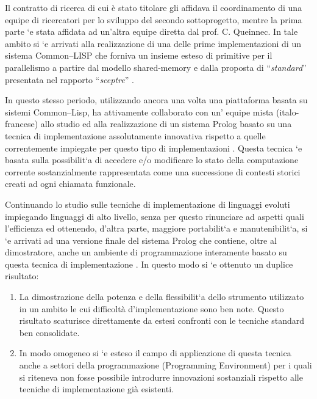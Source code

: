 \documentclass[11pt]{article}
\begin{document}
Il contratto di ricerca di cui \`e stato titolare gli affidava il
coordinamento di una equipe di ricercatori per lo sviluppo del secondo
sottoprogetto, mentre la prima parte \a`e stata affidata ad un'altra equipe
diretta dal prof. C. Queinnec.  In tale ambito si \a`e arrivati alla
realizzazione di una delle prime implementazioni di un sistema
Common--LISP che forniva un insieme esteso di primitive per il
parallelismo a partire dal modello shared-memory e dalla proposta
di ``{\sl standard}'' presentata nel rapporto ``{\sl sceptre}''
\cite{litp:1,ISCIS:1}.

In questo stesso periodo, utilizzando ancora una volta una piattaforma
basata su sistemi Common--Lisp, ha attivamente collaborato con un'
equipe mista (italo-francese) allo studio ed alla realizzazione di un
sistema Prolog basato su una tecnica di implementazione assolutamente
innovativa rispetto a quelle correntemente impiegate per questo tipo
di implementazioni \cite{mxlog:2,SPLT:89,GULP:89}.  Questa tecnica
\a`e basata sulla possibilit\a`a di accedere e/o modificare lo stato
della computazione corrente sostanzialmente rappresentata come una
successione di contesti storici creati ad ogni chiamata funzionale.

Continuando lo studio sulle tecniche di implementazione di
linguaggi evoluti impiegando linguaggi di alto livello, senza
per questo rinunciare ad aspetti quali l'efficienza ed ottenendo,
d'altra parte, maggiore portabilit\a`a e manutenibilit\a`a, si \a`e
arrivati ad una versione finale del sistema Prolog che contiene,
oltre al dimostratore, anche un ambiente di programmazione
interamente basato su questa tecnica di implementazione 
\cite{ISCIS:2,SEKE:1}. In questo modo si \a`e ottenuto un
duplice risultato:

\begin{enumerate}
\item La dimostrazione della potenza e della flessibilit\a`a dello
  strumento utilizzato in un ambito le cui difficolt\`a d'implementazione
  sono ben note. Questo risultato scaturisce direttamente da estesi
  confronti con le tecniche standard ben consolidate.

\item In modo omogeneo si \a`e esteso il campo di applicazione di
  questa tecnica anche a settori della programmazione (Programming
  Environment) per i quali si riteneva non fosse possibile introdurre
  innovazioni sostanziali rispetto alle tecniche di implementazione
  gi\`a esistenti.
\end{enumerate}
\end{document}
